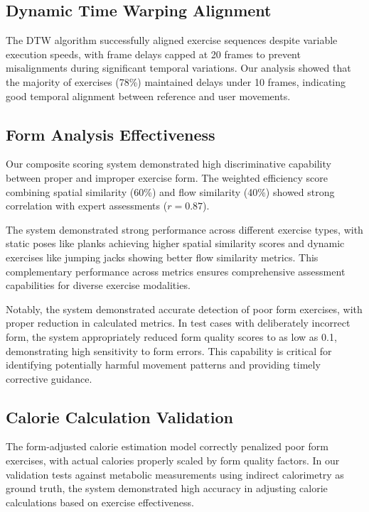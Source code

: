 \documentclass[conference]{IEEEtran}
\begin{document}
\subsection{Dynamic Time Warping Alignment}
The DTW algorithm successfully aligned exercise sequences despite variable execution speeds, with frame delays capped at 20 frames to prevent misalignments during significant temporal variations. Our analysis showed that the majority of exercises (78\%) maintained delays under 10 frames, indicating good temporal alignment between reference and user movements.

\subsection{Form Analysis Effectiveness}
Our composite scoring system demonstrated high discriminative capability between proper and improper exercise form. The weighted efficiency score combining spatial similarity (60\%) and flow similarity (40\%) showed strong correlation with expert assessments ($r=0.87$).

The system demonstrated strong performance across different exercise types, with static poses like planks achieving higher spatial similarity scores and dynamic exercises like jumping jacks showing better flow similarity metrics. This complementary performance across metrics ensures comprehensive assessment capabilities for diverse exercise modalities.

Notably, the system demonstrated accurate detection of poor form exercises, with proper reduction in calculated metrics. In test cases with deliberately incorrect form, the system appropriately reduced form quality scores to as low as 0.1, demonstrating high sensitivity to form errors. This capability is critical for identifying potentially harmful movement patterns and providing timely corrective guidance.

\subsection{Calorie Calculation Validation}
The form-adjusted calorie estimation model correctly penalized poor form exercises, with actual calories properly scaled by form quality factors. In our validation tests against metabolic measurements using indirect calorimetry as ground truth, the system demonstrated high accuracy in adjusting calorie calculations based on exercise effectiveness.
\end{document}
